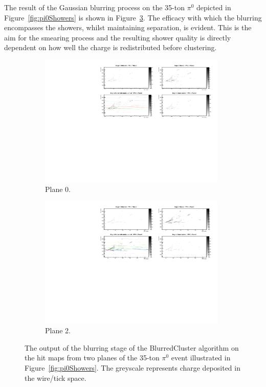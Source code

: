 The result of the Gaussian blurring process on the 35-ton $\pi^0$ depicted in Figure~\ref{fig:pi0Showers} is shown in Figure~\ref{fig:pi0ShowersBlurredMap}.  The efficacy with which the blurring encompasses the showers, whilst maintaining separation, is evident.  This is the aim for the smearing process and the resulting shower quality is directly dependent on how well the charge is redistributed before clustering.

\begin{figure}
  \centering
  \begin{subfigure}[t]{0.48\linewidth}
    \centering
    \includegraphics[width=0.98\textwidth]{EVDPi0BlurPlane0.pdf}
    \caption{Plane 0.}
    \label{fig:pi0ShowerBlurredMapPlane0}
  \end{subfigure}
  \hfill
  \begin{subfigure}[t]{0.48\linewidth}
    \centering
    \includegraphics[width=0.98\textwidth]{EVDPi0BlurPlane2.pdf}
    \caption{Plane 2.}
    \label{fig:pi0ShowerBlurredMapPlane2}
  \end{subfigure}
  \caption[The output of the blurring stage of the BlurredCluster algorithm on the hit maps from two planes of the 35-ton $\pi^0$ event illustrated in Figure~\ref{fig:pi0Showers}.]{The output of the blurring stage of the BlurredCluster algorithm on the hit maps from two planes of the 35-ton $\pi^0$ event illustrated in Figure~\ref{fig:pi0Showers}.  The greyscale represents charge deposited in the wire/tick space.}
  \label{fig:pi0ShowersBlurredMap}
\end{figure}

